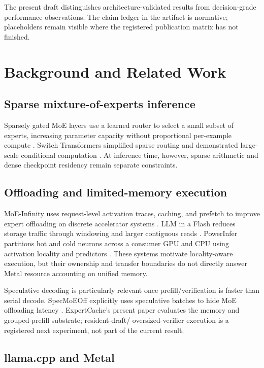 \documentclass[10pt,twocolumn]{article}
\newcommand{\system}{ExpertCache}
\begin{document}
The present draft distinguishes architecture-validated results from
decision-grade performance observations.  The claim ledger in the artifact
is normative; placeholders remain visible where the registered publication
matrix has not finished.

\section{Background and Related Work}

\subsection{Sparse mixture-of-experts inference}

Sparsely gated MoE layers use a learned router to select a small subset of
experts, increasing parameter capacity without proportional per-example
compute \cite{shazeer2017moe}.  Switch Transformers simplified sparse routing
and demonstrated large-scale conditional computation
\cite{fedus2022switch}.  At inference time, however, sparse arithmetic and
dense checkpoint residency remain separate constraints.

\subsection{Offloading and limited-memory execution}

MoE-Infinity uses request-level activation traces, caching, and prefetch to
improve expert offloading on discrete accelerator systems
\cite{xue2024moeinfinity}.  LLM in a Flash reduces storage traffic through
windowing and larger contiguous reads \cite{alizadeh2023llmflash}.
PowerInfer partitions hot and cold neurons across a consumer GPU and CPU using
activation locality and predictors \cite{song2023powerinfer}.  These systems
motivate locality-aware execution, but their ownership and transfer boundaries
do not directly answer Metal resource accounting on unified memory.

Speculative decoding is particularly relevant once prefill/verification is
faster than serial decode.  SpecMoEOff explicitly uses speculative batches to
hide MoE offloading latency \cite{wang2025specmoeoff}.  \system's present
paper evaluates the memory and grouped-prefill substrate; resident-draft/
oversized-verifier execution is a registered next experiment, not part of the
current result.

\subsection{llama.cpp and Metal}
\end{document}

